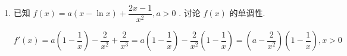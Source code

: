 \begin{enumerate}
\begin{jieda}
        ${f}^{\prime }\left( x\right)  = {x}^{2} - {3mx} = x\left( {x - {3m}}\right)$，要使函数 $f\left( x\right)$ 在区间(1,3)上不单调. 则有 $1 < {3m} < 3$ ,解得 $\dfrac{1}{3} < m < 1$
        
        所以 $p$ 是 $q$ 的必要不充分条件.
    \end{jieda}

    \item 已知 $f\left( x\right)  = a\left( {x - \ln x}\right)  + \dfrac{{2x} - 1}{{x}^{2}},a > 0$ . 讨论 $f\left( x\right)$ 的单调性.
    \begin{jieda}
        $f'(x) = a\left(1-\dfrac{1}{x}\right) - \dfrac{2}{x^2}+\dfrac{2}{x^3} = a\left(1-\dfrac{1}{x}\right)-\dfrac{2}{x^2}\left(1-\dfrac{1}{x}\right) = \left(a-\dfrac{2}{x^2}\right)\left(1-\dfrac{1}{x}\right), x > 0$
    \end{jieda}


\end{enumerate}
